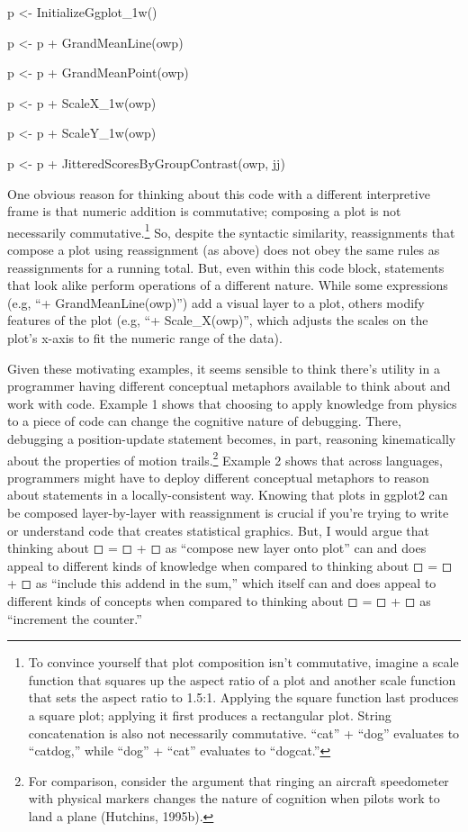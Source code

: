 p \textless{}- InitializeGgplot\_1w()

p \textless{}- p + GrandMeanLine(owp)

p \textless{}- p + GrandMeanPoint(owp)

p \textless{}- p + ScaleX\_1w(owp)

p \textless{}- p + ScaleY\_1w(owp)

p \textless{}- p + JitteredScoresByGroupContrast(owp, jj)

One obvious reason for thinking about this code with a different
interpretive frame is that numeric addition is commutative; composing a
plot is not necessarily commutative.\footnote{To convince yourself that
  plot composition isn't commutative, imagine a scale function that
  squares up the aspect ratio of a plot and another scale function that
  sets the aspect ratio to 1.5:1. Applying the square function last
  produces a square plot; applying it first produces a rectangular plot.
  String concatenation is also not necessarily commutative. ``cat'' +
  ``dog'' evaluates to ``catdog,'' while ``dog'' + ``cat'' evaluates to
  ``dogcat.''} So, despite the syntactic similarity, reassignments that
compose a plot using reassignment (as above) does not obey the same
rules as reassignments for a running total. But, even within this code
block, statements that look alike perform operations of a different
nature. While some expressions (e.g, ``+ GrandMeanLine(owp)'') add a
visual layer to a plot, others modify features of the plot (e.g, ``+
Scale\_X(owp)'', which adjusts the scales on the plot's x-axis to fit
the numeric range of the data).

Given these motivating examples, it seems sensible to think there's
utility in a programmer having different conceptual metaphors available
to think about and work with code. Example 1 shows that choosing to
apply knowledge from physics to a piece of code can change the cognitive
nature of debugging. There, debugging a position-update statement
becomes, in part, reasoning kinematically about the properties of motion
trails.\footnote{For comparison, consider the argument that ringing an
  aircraft speedometer with physical markers changes the nature of
  cognition when pilots work to land a plane (Hutchins, 1995b).} Example
2 shows that across languages, programmers might have to deploy
different conceptual metaphors to reason about statements in a
locally-consistent way. Knowing that plots in ggplot2 can be composed
layer-by-layer with reassignment is crucial if you're trying to write or
understand code that creates statistical graphics. But, I would argue
that thinking about ◻ = ◻ + ◻ as ``compose new layer onto plot'' can and
does appeal to different kinds of knowledge when compared to thinking
about ◻ = ◻ + ◻ as ``include this addend in the sum,'' which itself can
and does appeal to different kinds of concepts when compared to thinking
about ◻ = ◻ + ◻ as ``increment the counter.''

